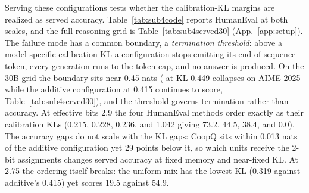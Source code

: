 Serving these configurations tests whether the calibration-KL margins are realized as served
accuracy. Table~\ref{tab:sub4code} reports HumanEval at both scales, and the full reasoning grid is
Table~\ref{tab:sub4served30} (App.~\ref{app:setup}). The failure mode has a common boundary, a
\emph{termination threshold}: above a model-specific calibration KL a configuration stops emitting
its end-of-sequence token, every generation runs to the token cap, and no answer is produced. On the
30B grid the boundary sits near 0.45 nats ( at KL 0.449 collapses on AIME-2025 while
the additive configuration at 0.415 continues to score, Table~\ref{tab:sub4served30}), and the
threshold governs termination rather than accuracy. At effective bits 2.9 the four HumanEval methods
order exactly as their calibration KLs (0.215, 0.228, 0.236, and 1.042 giving 73.2, 44.5, 38.4, and
0.0). The accuracy gaps do not scale with the KL gaps:
CoopQ sits within 0.013 nats of the additive configuration yet 29 points below it, so which units
receive the 2-bit assignments
changes served accuracy at fixed memory and near-fixed KL. At 2.75 the ordering itself breaks: the
uniform mix has the lowest KL (0.319 against additive's 0.415) yet scores 19.5 against 54.9.



